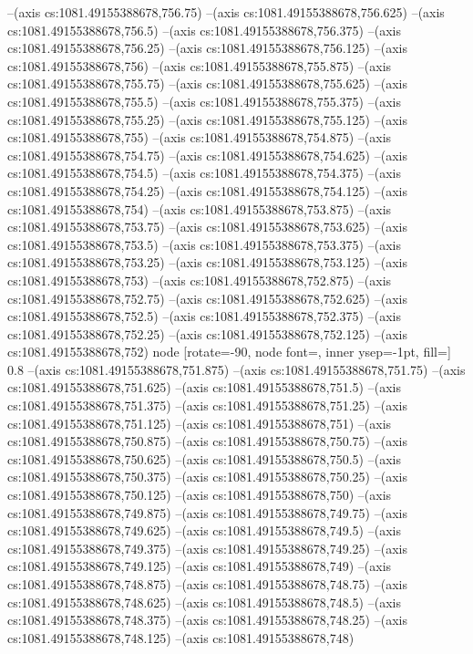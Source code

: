 --(axis cs:1081.49155388678,756.75)
--(axis cs:1081.49155388678,756.625)
--(axis cs:1081.49155388678,756.5)
--(axis cs:1081.49155388678,756.375)
--(axis cs:1081.49155388678,756.25)
--(axis cs:1081.49155388678,756.125)
--(axis cs:1081.49155388678,756)
--(axis cs:1081.49155388678,755.875)
--(axis cs:1081.49155388678,755.75)
--(axis cs:1081.49155388678,755.625)
--(axis cs:1081.49155388678,755.5)
--(axis cs:1081.49155388678,755.375)
--(axis cs:1081.49155388678,755.25)
--(axis cs:1081.49155388678,755.125)
--(axis cs:1081.49155388678,755)
--(axis cs:1081.49155388678,754.875)
--(axis cs:1081.49155388678,754.75)
--(axis cs:1081.49155388678,754.625)
--(axis cs:1081.49155388678,754.5)
--(axis cs:1081.49155388678,754.375)
--(axis cs:1081.49155388678,754.25)
--(axis cs:1081.49155388678,754.125)
--(axis cs:1081.49155388678,754)
--(axis cs:1081.49155388678,753.875)
--(axis cs:1081.49155388678,753.75)
--(axis cs:1081.49155388678,753.625)
--(axis cs:1081.49155388678,753.5)
--(axis cs:1081.49155388678,753.375)
--(axis cs:1081.49155388678,753.25)
--(axis cs:1081.49155388678,753.125)
--(axis cs:1081.49155388678,753)
--(axis cs:1081.49155388678,752.875)
--(axis cs:1081.49155388678,752.75)
--(axis cs:1081.49155388678,752.625)
--(axis cs:1081.49155388678,752.5)
--(axis cs:1081.49155388678,752.375)
--(axis cs:1081.49155388678,752.25)
--(axis cs:1081.49155388678,752.125)
--(axis cs:1081.49155388678,752)
node [rotate=-90, node font=\tiny, inner ysep=-1pt, fill=\bgcol] {0.8}
--(axis cs:1081.49155388678,751.875)
--(axis cs:1081.49155388678,751.75)
--(axis cs:1081.49155388678,751.625)
--(axis cs:1081.49155388678,751.5)
--(axis cs:1081.49155388678,751.375)
--(axis cs:1081.49155388678,751.25)
--(axis cs:1081.49155388678,751.125)
--(axis cs:1081.49155388678,751)
--(axis cs:1081.49155388678,750.875)
--(axis cs:1081.49155388678,750.75)
--(axis cs:1081.49155388678,750.625)
--(axis cs:1081.49155388678,750.5)
--(axis cs:1081.49155388678,750.375)
--(axis cs:1081.49155388678,750.25)
--(axis cs:1081.49155388678,750.125)
--(axis cs:1081.49155388678,750)
--(axis cs:1081.49155388678,749.875)
--(axis cs:1081.49155388678,749.75)
--(axis cs:1081.49155388678,749.625)
--(axis cs:1081.49155388678,749.5)
--(axis cs:1081.49155388678,749.375)
--(axis cs:1081.49155388678,749.25)
--(axis cs:1081.49155388678,749.125)
--(axis cs:1081.49155388678,749)
--(axis cs:1081.49155388678,748.875)
--(axis cs:1081.49155388678,748.75)
--(axis cs:1081.49155388678,748.625)
--(axis cs:1081.49155388678,748.5)
--(axis cs:1081.49155388678,748.375)
--(axis cs:1081.49155388678,748.25)
--(axis cs:1081.49155388678,748.125)
--(axis cs:1081.49155388678,748)
